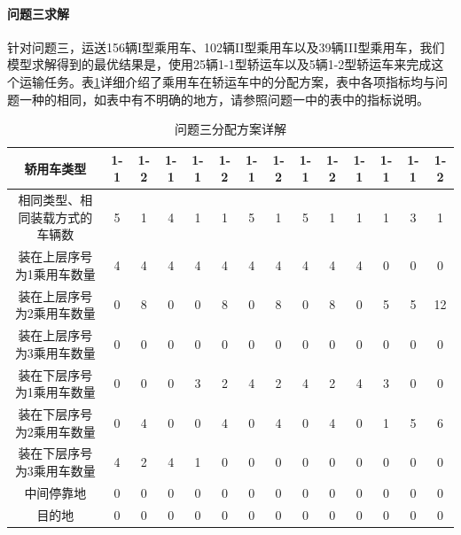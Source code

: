 \documentclass[UTF8，12pt]{ctexart}
\begin{document}
\paragraph{问题三求解}
针对问题三，运送156辆I型乘用车、102辆II型乘用车以及39辆III型乘用车，我们模型求解得到的最优结果是，使用25辆1-1型轿运车以及5辆1-2型轿运车来完成这个运输任务。表\ref{tab:answer3}详细介绍了乘用车在轿运车中的分配方案，表中各项指标均与问题一种的相同，如表中有不明确的地方，请参照问题一中的表中的指标说明。
\begin{table}[h!]
\centering
\caption{问题三分配方案详解}\label{tab:answer3}
\begin{tabular}{|c|c|c|c|c|c|c|c|c|c|c|c|c|c|}
\hline
轿用车类型 & 1-1 & 1-2 & 1-1 & 1-1 & 1-2 & 1-1 & 1-2 & 1-1 & 1-2 & 1-1 & 1-1 & 1-1 & 1-2\\ \hline 
相同类型、相同装载方式的车辆数 & 5 & 1 & 4 & 1 & 1 & 5 & 1 & 5 & 1 & 1 & 1 & 3 & 1\\ \hline 
装在上层序号为1乘用车数量 & 4 & 4 & 4 & 4 & 4 & 4 & 4 & 4 & 4 & 4 & 0 & 0 & 0\\ \hline 
装在上层序号为2乘用车数量 & 0 & 8 & 0 & 0 & 8 & 0 & 8 & 0 & 8 & 0 & 5 & 5 & 12\\ \hline 
装在上层序号为3乘用车数量 & 0 & 0 & 0 & 0 & 0 & 0 & 0 & 0 & 0 & 0 & 0 & 0 & 0\\ \hline 
装在下层序号为1乘用车数量 & 0 & 0 & 0 & 3 & 2 & 4 & 2 & 4 & 2 & 4 & 3 & 0 & 0\\ \hline 
装在下层序号为2乘用车数量 & 0 & 4 & 0 & 0 & 4 & 0 & 4 & 0 & 4 & 0 & 1 & 5 & 6\\ \hline 
装在下层序号为3乘用车数量 & 4 & 2 & 4 & 1 & 0 & 0 & 0 & 0 & 0 & 0 & 0 & 0 & 0\\ \hline 
中间停靠地 & 0 & 0 & 0 & 0 & 0 & 0 & 0 & 0 & 0 & 0 & 0 & 0 & 0\\ \hline 
目的地 & 0 & 0 & 0 & 0 & 0 & 0 & 0 & 0 & 0 & 0 & 0 & 0 & 0\\ \hline 
\end{tabular}
\end{table}
\end{document}
